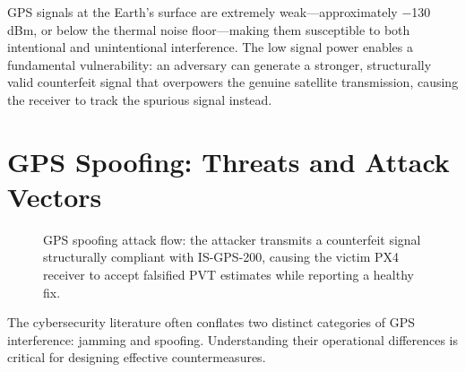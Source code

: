 GPS signals at the Earth's surface are extremely weak---approximately $-$130\,dBm, or below the thermal noise floor---making them susceptible to both intentional and unintentional interference. The low signal power enables a fundamental vulnerability: an adversary can generate a stronger, structurally valid counterfeit signal that overpowers the genuine satellite transmission, causing the receiver to track the spurious signal instead.

\section{GPS Spoofing: Threats and Attack Vectors}

\begin{figure}[H]
\centering
{}
\caption{GPS spoofing attack flow: the attacker transmits a counterfeit signal structurally compliant with IS-GPS-200, causing the victim PX4 receiver to accept falsified PVT estimates while reporting a healthy fix.}
\label{fig:spoof_attack_flow}
\end{figure}

The cybersecurity literature often conflates two distinct categories of GPS interference: jamming and spoofing. Understanding their operational differences is critical for designing effective countermeasures.

